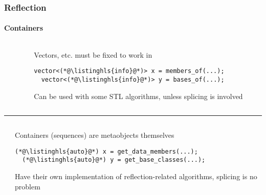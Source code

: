 \documentclass[compress,table,xcolor=table]{beamer}
\begin{document}
\begin{frame}[fragile]
  \frametitle{Reflection}
  \framesubtitle{Containers}
  \begin{columns}
    \begin{column}{.05\textwidth}
    \end{column}
    \begin{column}{.85\textwidth}
    \normalsize
    Vectors, etc. must be fixed to work in 
    \begin{lstlisting}[language=c++2x,basicstyle=\normalsize\ttfamily]
  vector<(*@\listinghls{info}@*)> x = members_of(...);
  vector<(*@\listinghls{info}@*)> y = bases_of(...);
    \end{lstlisting}
    Can be used with some STL algorithms, unless splicing is involved
    \end{column}
  \end{columns}
  \vfill
  \hrule
  \vfill
  \begin{columns}
    \begin{column}{.05\textwidth}
    \end{column}
    \begin{column}{.85\textwidth}
    \normalsize
      Containers (sequences) are metaobjects themselves
    \begin{lstlisting}[language=c++2x,basicstyle=\normalsize\ttfamily]
  (*@\listinghls{auto}@*) x = get_data_members(...);
  (*@\listinghls{auto}@*) y = get_base_classes(...);
    \end{lstlisting}
    Have their own implementation of reflection-related algorithms, splicing
      is no problem
    \end{column}
  \end{columns}
\end{frame}
\end{document}
